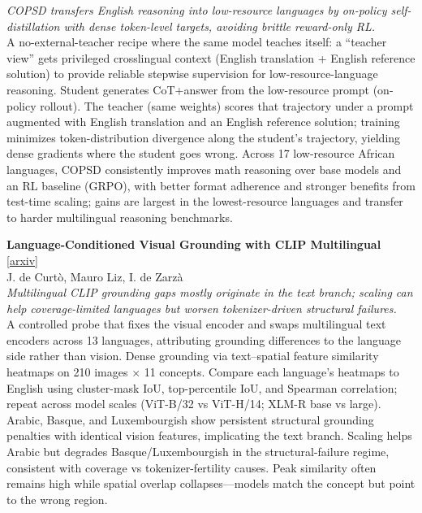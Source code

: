 \documentclass[12pt,letterpaper]{article}
\begin{document}
{\small\textit{COPSD transfers English reasoning into low-resource languages by on-policy self-distillation with dense token-level targets, avoiding brittle reward-only RL.}}\\[1pt]
{\footnotesize A no-external-teacher recipe where the same model teaches itself: a ``teacher view'' gets privileged crosslingual context (English translation + English reference solution) to provide reliable stepwise supervision for low-resource-language reasoning. Student generates CoT+answer from the low-resource prompt (on-policy rollout). The teacher (same weights) scores that trajectory under a prompt augmented with English translation and an English reference solution; training minimizes token-distribution divergence along the student's trajectory, yielding dense gradients where the student goes wrong. Across 17 low-resource African languages, COPSD consistently improves math reasoning over base models and an RL baseline (GRPO), with better format adherence and stronger benefits from test-time scaling; gains are largest in the lowest-resource languages and transfer to harder multilingual reasoning benchmarks.}

\medskip

{\small\textbf{Language-Conditioned Visual Grounding with CLIP Multilingual}} {\scriptsize[\href{https://arxiv.org/abs/2605.09060}{arxiv}]}\\
{\scriptsize J. de Curt\`o, Mauro Liz, I. de Zarz\`a}\\

{\small\textit{Multilingual CLIP grounding gaps mostly originate in the text branch; scaling can help coverage-limited languages but worsen tokenizer-driven structural failures.}}\\[1pt]
{\footnotesize A controlled probe that fixes the visual encoder and swaps multilingual text encoders across 13 languages, attributing grounding differences to the language side rather than vision. Dense grounding via text--spatial feature similarity heatmaps on 210 images × 11 concepts. Compare each language's heatmaps to English using cluster-mask IoU, top-percentile IoU, and Spearman correlation; repeat across model scales (ViT-B/32 vs ViT-H/14; XLM-R base vs large). Arabic, Basque, and Luxembourgish show persistent structural grounding penalties with identical vision features, implicating the text branch. Scaling helps Arabic but degrades Basque/Luxembourgish in the structural-failure regime, consistent with coverage vs tokenizer-fertility causes. Peak similarity often remains high while spatial overlap collapses---models match the concept but point to the wrong region.}
\end{document}
